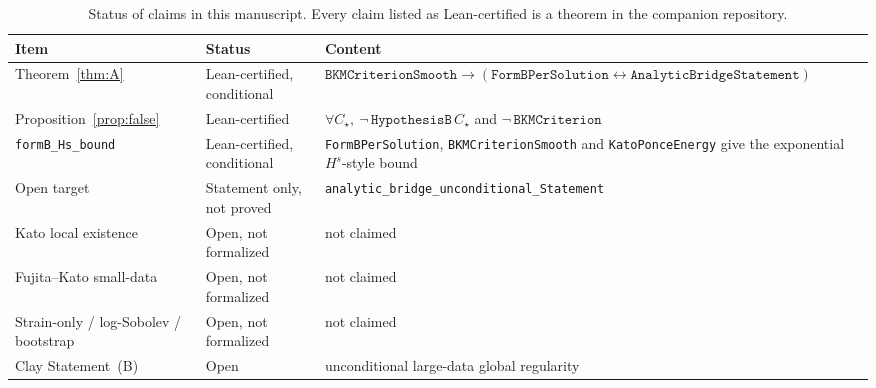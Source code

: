 \documentclass[11pt,reqno]{amsart}
\theoremstyle{definition}
\numberwithin{equation}{section}
\begin{document}
\begin{table}[htbp]
\centering
\caption{Status of claims in this manuscript. Every claim listed as Lean-certified is a theorem in the companion repository.}
\label{tab:status}
\begin{tabular}{@{}llp{7.2cm}@{}}
\toprule
\textbf{Item} & \textbf{Status} & \textbf{Content} \\
\midrule
Theorem~\ref{thm:A} & Lean-certified, conditional & \(\texttt{BKMCriterionSmooth}\to(\texttt{FormBPerSolution}\leftrightarrow\texttt{AnalyticBridgeStatement})\) \\
Proposition~\ref{prop:false} & Lean-certified & \(\forall C_\star,\ \neg\,\texttt{HypothesisB}\,C_\star\) and \(\neg\,\texttt{BKMCriterion}\) \\
\texttt{formB\_Hs\_bound} & Lean-certified, conditional & \texttt{FormBPerSolution}, \texttt{BKMCriterionSmooth} and \texttt{KatoPonceEnergy} give the exponential \(H^s\)-style bound \\
Open target & Statement only, not proved & \texttt{analytic\_bridge\_unconditional\_Statement} \\
Kato local existence & Open, not formalized & not claimed \\
Fujita--Kato small-data & Open, not formalized & not claimed \\
Strain-only / log-Sobolev / bootstrap & Open, not formalized & not claimed \\
Clay Statement~(B) & Open & unconditional large-data global regularity \\
\bottomrule
\end{tabular}
\end{table}





\end{document}
